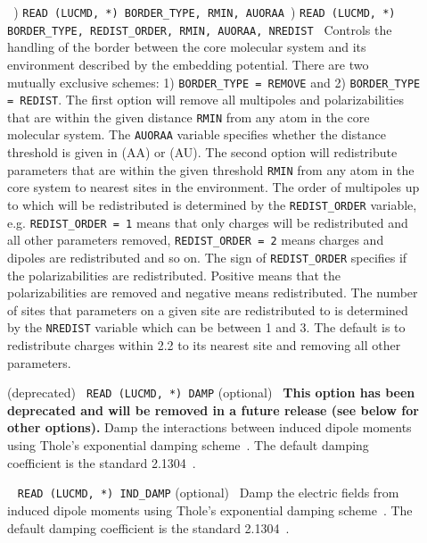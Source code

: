 \begin{description}
\item[]\verb| |) \verb|READ (LUCMD, *) BORDER_TYPE, RMIN, AUORAA|\verb| |) \verb|READ (LUCMD, *) BORDER_TYPE, REDIST_ORDER, RMIN, AUORAA, NREDIST|\verb| |\newline
Controls the handling of the border between the core molecular system
and its environment described by the embedding potential. There are
two mutually exclusive schemes: 1) \verb|BORDER_TYPE = REMOVE| and 2)
\verb|BORDER_TYPE = REDIST|. The first option will remove all
multipoles and polarizabilities that are within the given distance
\verb|RMIN| from any atom in the core molecular system. The
\verb|AUORAA| variable specifies whether the distance threshold is
given in \angstrom{} (AA) or \bohr{} (AU). The second option will
redistribute parameters that are within the given threshold
\verb|RMIN| from any atom in the core system to nearest sites in the
environment. The order of multipoles up to which will be redistributed
is determined by the \verb|REDIST_ORDER| variable,
e.g. \verb|REDIST_ORDER = 1| means that only charges will be
redistributed and all other parameters removed,
\verb|REDIST_ORDER = 2| means charges and dipoles are redistributed
and so on. The sign of \verb|REDIST_ORDER| specifies if the
polarizabilities are redistributed. Positive means that the
polarizabilities are removed and negative means redistributed. The
number of sites that parameters on a given site are redistributed to
is determined by the \verb|NREDIST| variable which can be between 1
and 3. The default is to redistribute charges within 2.2 \bohr{} to its
nearest site and removing all other parameters.

\item[] (deprecated)\verb| |\newline
\verb|READ (LUCMD, *) DAMP| (optional)\verb| |\newline
\textbf{This option has been deprecated and will be removed in a future release (see below for other options).} Damp the interactions between induced dipole moments using Thole's exponential damping scheme~\cite{thole_damp_1,thole_damp_2}. The default damping coefficient is the standard 2.1304~\cite{thole_damp_2}.

\item[]\verb| |\newline
\verb|READ (LUCMD, *) IND_DAMP| (optional)\verb| |\newline
Damp the electric fields from induced dipole moments using Thole's exponential damping scheme~\cite{thole_damp_1,thole_damp_2}. The default damping coefficient is the standard 2.1304~\cite{thole_damp_2}.


\end{description}
